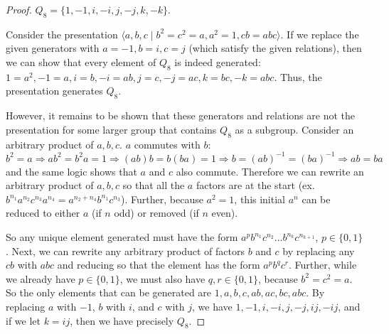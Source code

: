\documentclass{article}
\begin{document}
\begin{proof}
    $Q_8 = \{ 1, -1, i, -i, j, -j, k, -k \}$.

    Consider the presentation $\langle a, b, c \mid b^2 = c^2 = a, a^2 = 1, cb = abc \rangle$. If we replace the given generators with $a = -1, b = i, c = j$ (which satisfy the given relations), then we can show that every element of $Q_8$ is indeed generated: $1 = a^2, -1 = a, i = b, -i = ab, j = c, -j = ac, k = bc, -k = abc$. Thus, the presentation generates $Q_8$.

    However, it remains to be shown that these generators and relations are not the presentation for some larger group that contains $Q_8$ as a subgroup. Consider an arbitrary product of $a, b, c$. $a$ commutes with $b$:
    \begin{equation*}
        b^2 = a \Rightarrow ab^2 = b^2 a = 1 \Rightarrow (ab)b = b(ba) = 1 \Rightarrow b = (ab)^{-1} = (ba)^{-1} \Rightarrow ab = ba
    \end{equation*}
    and the same logic shows that $a$ and $c$ also commute. Therefore we can rewrite an arbitrary product of $a, b, c$ so that all the $a$ factors are at the start (ex. $b^{n_1} a^{n_2} c^{n_3} a^{n_4} = a^{n_2 + n_4} b^{n_1} c^{n_3}$). Further, because $a^2 = 1$, this initial $a^n$ can be reduced to either $a$ (if $n$ odd) or removed (if $n$ even).

    So any unique element generated must have the form $a^{p}b^{n_1}c^{n_2}...b^{n_k}c^{n_{k + 1}}$, $p \in \{0, 1\}$. Next, we can rewrite any arbitrary product of factors $b$ and $c$ by replacing any $cb$ with $abc$ and reducing so that the element has the form $a^{p}b^{q}c^{r}$. Further, while we already have $p \in \{0, 1\}$, we must also have $q, r \in \{0, 1\}$, because $b^2 = c^2 = a$. So the only elements that can be generated are $1, a, b, c, ab, ac, bc, abc$. By replacing $a$ with $-1$, $b$ with $i$, and $c$ with $j$, we have $1, -1, i, -i, j, -j, ij, -ij$, and if we let $k = ij$, then we have precisely $Q_8$.
\end{proof}
\end{document}
